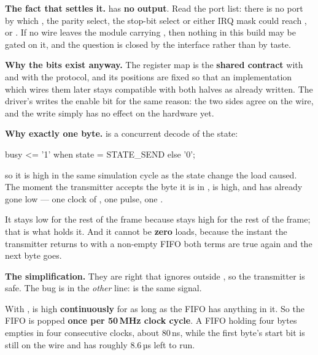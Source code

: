 \textbf{The fact that settles it.}  has \textbf{no  output}. Read the port
list: there is no port by which , the parity select, the stop-bit select or either IRQ
mask could reach ,  or . If no wire leaves the module
carrying , then nothing in this build may be gated on it, and the question is closed by
the interface rather than by taste. 

\textbf{Why the bits exist anyway.} The register map is the \textbf{shared contract} with
 and with the protocol, and its positions are fixed so that an implementation
which wires them later stays compatible with both halves as already written. The driver's
 writes the enable bit for the same reason: the two sides agree on the wire, and
the write simply has no effect on the hardware yet.

\textbf{Why exactly one byte.}  is a concurrent decode of the state:

\begin{vhdlcode}
busy <= '1' when state = STATE_SEND else '0';
\end{vhdlcode}

\noindent so it is high in the same simulation cycle as the state change the load caused. The
moment the transmitter accepts the byte it is in ,  is high, and
 has already gone low --- one clock of , one  pulse, one
.

It stays low for the rest of the frame because  stays high for the rest of the frame;
that is what holds it. And it cannot be \textbf{zero} loads, because the instant the transmitter
returns to  with a non-empty FIFO both terms are true again and the next byte goes.

\textbf{The simplification.} They are right that  ignores  outside
, so the transmitter is safe. The bug is in the \emph{other} line:  is
the same signal.

With ,  is high \textbf{continuously} for as long as
the FIFO has anything in it. So the FIFO is popped \textbf{once per 50\,MHz clock cycle}. A FIFO
holding four bytes empties in four consecutive clocks, about 80\,ns, while the first byte's start bit
is still on the wire and has roughly 8.6\,µs left to run.

